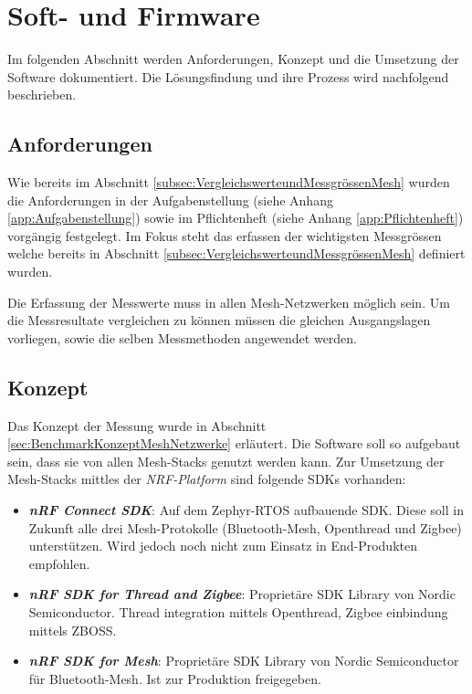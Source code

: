 \clearpage
\section{Soft- und Firmware}\label{sec:Soft-undFirmware}


Im folgenden Abschnitt werden Anforderungen, Konzept und die Umsetzung der Software dokumentiert. Die Lösungsfindung und ihre Prozess wird nachfolgend beschrieben. 

\subsection{Anforderungen}\label{subsec:Software_Anforderungen}

Wie bereits im Abschnitt \ref{subsec:VergleichswerteundMessgrössenMesh} wurden die Anforderungen in der Aufgabenstellung (siehe Anhang \ref{app:Aufgabenstellung}) sowie im Pflichtenheft (siehe Anhang \ref{app:Pflichtenheft}) vorgängig festgelegt. Im Fokus steht das erfassen der wichtigsten Messgrössen welche bereits in Abschnitt \ref{subsec:VergleichswerteundMessgrössenMesh} definiert wurden. 

Die Erfassung der Messwerte muss in allen Mesh-Netzwerken möglich sein. Um die Messresultate vergleichen zu können müssen die gleichen Ausgangslagen vorliegen, sowie die selben Messmethoden angewendet werden. 


\subsection{Konzept}\label{subsec:Software_Konzept}

Das Konzept der Messung wurde in Abschnitt \ref{sec:BenchmarkKonzeptMeshNetzwerke} erläutert. Die Software soll so aufgebaut sein, dass sie von allen Mesh-Stacks genutzt werden kann. Zur Umsetzung der Mesh-Stacks mittles der \textit{NRF-Platform} sind folgende SDKs vorhanden: 

\begin{itemize}
	\item \textit{\textbf{nRF Connect SDK}}: Auf dem Zephyr-RTOS aufbauende SDK. Diese soll in Zukunft alle drei Mesh-Protokolle (Bluetooth-Mesh, Openthread und Zigbee) unterstützen. Wird jedoch noch nicht zum Einsatz in End-Produkten empfohlen. \cite{nordic_semi_welcome_to_the_nrf_connect_sdk_2020}
	\item \textit{\textbf{nRF SDK for Thread and Zigbee}}: Proprietäre SDK Library von Nordic Semiconductor. Thread integration mittels Openthread, Zigbee einbindung mittels ZBOSS. \cite{nordic_semi_nrf_sdk_for_thread_and_zigbee_2020}
	\item \textit{\textbf{nRF SDK for Mesh}}: Proprietäre SDK Library von Nordic Semiconductor für Bluetooth-Mesh. Ist zur Produktion freigegeben. \cite{nordic_semi_nrf_sdk_for_mesh_2020}
\end{itemize}

